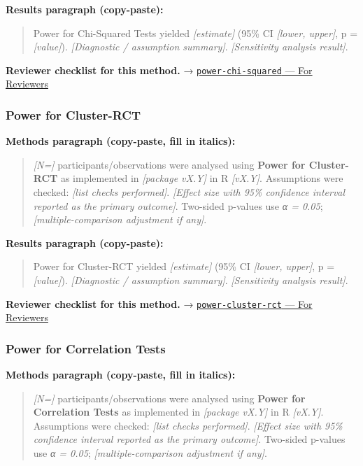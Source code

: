 \documentclass[
]{article}
\begin{document}
\textbf{Results paragraph (copy-paste):}

\begin{quote}
Power for Chi-Squared Tests yielded \emph{{[}estimate{]}} (95\% CI
\emph{{[}lower, upper{]}}, p = \emph{{[}value{]}}). \emph{{[}Diagnostic
/ assumption summary{]}}. \emph{{[}Sensitivity analysis result{]}}.
\end{quote}

\textbf{Reviewer checklist for this method.} →
\href{../chapters/05-power/power-chi-squared.Rmd\#for-reviewers}{\texttt{power-chi-squared}
--- For Reviewers}

\subsubsection{Power for Cluster-RCT}\label{power-for-cluster-rct}

\textbf{Methods paragraph (copy-paste, fill in italics):}

\begin{quote}
\emph{{[}N={]}} participants/observations were analysed using
\textbf{Power for Cluster-RCT} as implemented in \emph{{[}package
vX.Y{]}} in R \emph{{[}vX.Y{]}}. Assumptions were checked: \emph{{[}list
checks performed{]}}. \emph{{[}Effect size with 95\% confidence interval
reported as the primary outcome{]}}. Two-sided p-values use \emph{α =
0.05}; \emph{{[}multiple-comparison adjustment if any{]}}.
\end{quote}

\textbf{Results paragraph (copy-paste):}

\begin{quote}
Power for Cluster-RCT yielded \emph{{[}estimate{]}} (95\% CI
\emph{{[}lower, upper{]}}, p = \emph{{[}value{]}}). \emph{{[}Diagnostic
/ assumption summary{]}}. \emph{{[}Sensitivity analysis result{]}}.
\end{quote}

\textbf{Reviewer checklist for this method.} →
\href{../chapters/05-power/power-cluster-rct.Rmd\#for-reviewers}{\texttt{power-cluster-rct}
--- For Reviewers}

\subsubsection{Power for Correlation
Tests}\label{power-for-correlation-tests}

\textbf{Methods paragraph (copy-paste, fill in italics):}

\begin{quote}
\emph{{[}N={]}} participants/observations were analysed using
\textbf{Power for Correlation Tests} as implemented in \emph{{[}package
vX.Y{]}} in R \emph{{[}vX.Y{]}}. Assumptions were checked: \emph{{[}list
checks performed{]}}. \emph{{[}Effect size with 95\% confidence interval
reported as the primary outcome{]}}. Two-sided p-values use \emph{α =
0.05}; \emph{{[}multiple-comparison adjustment if any{]}}.
\end{quote}
\end{document}
